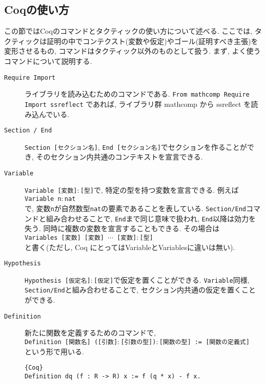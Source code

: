 \documentclass[11pt]{jsreport}
\theoremstyle{mystyle}
\newcommand{\0}{\textbf{0}}
\newcommand{\1}{\textbf{1}}
\newcommand{\2}{\textbf{2}}
\begin{document}
\subsection{Coqの使い方} \label{ssec coq_use}
この節ではCoqのコマンドとタクティックの使い方について述べる. ここでは, タクティックは証明の中でコンテクスト(変数や仮定)やゴール(証明すべき主張)を変形させるもの, コマンドはタクティック以外のものとして扱う. 
まず, よく使うコマンドについて説明する. 
\begin{description}
  \item[\tt Require Import]
    ライブラリを読み込むためのコマンドである.
    {\tt From mathcomp Require Import ssreflect}
    であれば, ライブラリ群 mathcomp から ssreflect を読み込んでいる.
  \item[\tt Section / End]
    {\tt Section [セクション名]}, {\tt End [セクション名]}でセクションを作ることができ, 
    そのセクション内共通のコンテキストを宣言できる. 
  \item[\tt Variable]
    {\tt Variable [変数]$\colon$[型]}で, 特定の型を持つ変数を宣言できる. 例えば\\
    {\tt Variable n$\colon$nat}\\
    で, 変数{\tt n}が自然数型{\tt nat}の要素であることを表している. 
    {\tt Section/End}コマンドと組み合わせることで, {\tt End}まで同じ意味で扱われ, 
    {\tt End}以降は効力を失う. 
    同時に複数の変数を宣言することもできる. その場合は\\
    {\tt Variables [変数] [変数] $\cdots$ [変数]$\colon$[型]}\\
    と書く(ただし, Coq にとっては{Variable}と{Variables}に違いは無い).    
  \item[\tt Hypothesis]
    {\tt Hypothesis [仮定名]$\colon$[仮定]}で仮定を置くことができる. {\tt Variable}同様, 
    {\tt Section/End}と組み合わせることで, セクション内共通の仮定を置くことができる. 
  \item[\tt Definition]
    新たに関数を定義するためのコマンドで, \\
    {\tt Definition [関数名] ([引数]$\colon$[引数の型])$\colon$[関数の型] := 
    [関数の定義式]}\\
    という形で用いる. 
    \begin{lstlisting}{Coq}
Definition dq (f : R -> R) x := f (q * x) - f x. \end{lstlisting}

\end{description}
\end{document}
